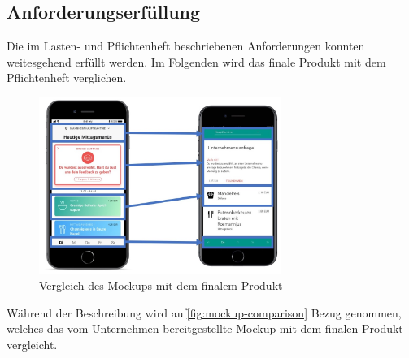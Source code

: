 \subsection{Anforderungserfüllung}
Die im Lasten- und Pflichtenheft beschriebenen Anforderungen konnten weitesgehend erfüllt werden. Im Folgenden wird das finale Produkt mit dem Pflichtenheft verglichen. 
\begin{figure}[H]
\centering
\includegraphics[width=0.7\textwidth]{images/docs-comparison}
\caption[Vergleich des Mockups mit dem finalem Produkt]{Vergleich des Mockups mit dem finalem Produkt}
\label{fig:mockup-comparison}
\end{figure}

Während der Beschreibung wird auf\vref{fig:mockup-comparison} Bezug genommen, welches das vom Unternehmen bereitgestellte Mockup mit dem finalen Produkt vergleicht.

